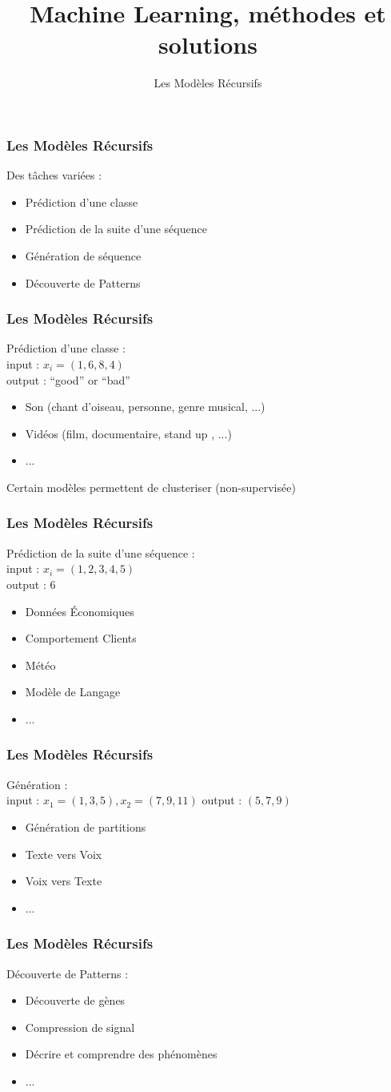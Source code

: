 \documentclass{formation}
\title{Machine Learning, méthodes et solutions}
\subtitle{Les Modèles Récursifs}
\begin{document}
\maketitle

\begin{frame}
  \frametitle{Les Modèles Récursifs}
  Des tâches variées :
  \begin{itemize}
  \item Prédiction d'une classe
  \item Prédiction de la suite d'une séquence
  \item Génération de séquence
  \item Découverte de Patterns
  \end{itemize}
\end{frame}

\begin{frame}
  \frametitle{Les Modèles Récursifs}
  Prédiction d'une classe : \\
  input : $x_i=(1,6,8,4)$ \\
  output : ``good'' or ``bad''
  \begin{itemize}
  \item Son (chant d'oiseau, personne, genre musical, ...)
  \item Vidéos (film, documentaire, stand up , ...)
  \item ...
  \end{itemize}
  Certain modèles permettent de clusteriser (non-supervisée)
\end{frame}

\begin{frame}
  \frametitle{Les Modèles Récursifs}
  Prédiction de la suite d'une séquence : \\
  input : $x_i=(1,2,3,4,5)$ \\
  output : 6
  \begin{itemize}
  \item Données Économiques
  \item Comportement Clients
  \item Météo
  \item Modèle de Langage
  \item ...
  \end{itemize}
\end{frame}

\begin{frame}
  \frametitle{Les Modèles Récursifs}
  Génération : \\
  input : $x_1=(1,3,5),x_2=(7,9,11)$
  output : $(5,7,9)$
  \begin{itemize}
  \item Génération de partitions
  \item Texte vers Voix
  \item Voix vers Texte
  \item ...
  \end{itemize}
\end{frame}

\begin{frame}
  \frametitle{Les Modèles Récursifs}
  Découverte de Patterns :
  \begin{itemize}
  \item Découverte de gènes
  \item Compression de signal
  \item Décrire et comprendre des phénomènes
  \item ...
  \end{itemize}
\end{frame}
\end{document}

